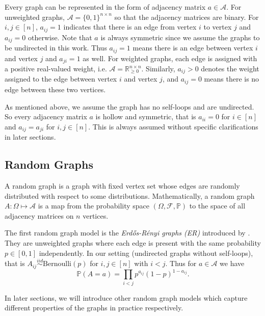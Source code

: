 Every graph can be represented in the form of adjacency matrix $a \in \mathcal{A}$. For unweighted graphs, $\mathcal{A} = \{ 0, 1 \}^{n \times n}$ so that the adjacency matrices are binary. For $i, j \in [n]$, $a_{ij} = 1$ indicates that there is an edge from vertex $i$ to vertex $j$ and $a_{ij} = 0$ otherwise. Note that $a$ is always symmetric since we assume the graphs to be undirected in this work. Thus $a_{ij} = 1$ means there is an edge between vertex $i$ and vertex $j$ and $a_{ji} = 1$ as well. For weighted graphs, each edge is assigned with a positive real-valued weight, i.e. $\mathcal{A} = \mathbb{R}^{n \times n}_{\ge 0}$. Similarly, $a_{ij} > 0$ denotes the weight assigned to the edge between vertex $i$ and vertex $j$, and $a_{ij} = 0$ means there is no edge between these two vertices.

As mentioned above, we assume the graph has no self-loops and are undirected. So every adjacency matrix $a$ is hollow and symmetric, that is $a_{ii} = 0$ for $i \in [n]$ and $a_{ij} = a_{ji}$ for $i, j \in [n]$. This is always assumed without specific clarifications in later sections.


\subsection{Random Graphs}
\label{sec:random_graphs}
A random graph is a graph with fixed vertex set whose edges are randomly distributed with respect to some distributions. Mathematically, a random graph $A: \Omega \mapsto \mathcal{A}$ is a map from the probability space $(\Omega, \mathcal{F}, \mathbb{P})$ to the space of all adjacency matrices on $n$ vertices.

\begin{example}
\label{example:ER}
The first random graph model is the {\em{Erd\H{o}s-R{\'e}nyi graphs} (ER)} introduced by \citep{gilbert1959random}.  They are unweighted graphs where each edge is present with the same probability $p \in [0, 1]$ independently. In our setting (undirected graphs without self-loops), that is $A_{ij} \stackrel{iid}{\sim} \mathrm{Bernoulli}(p)$ for $i, j \in [n]$ with $i < j$. Thus for $a \in \mathcal{A}$ we have
\[
	\mathbb{P}(A = a) = \prod_{i < j} p^{a_{ij}} (1 - p)^{1 - a_{ij}}.
\]
\end{example}

In later sections, we will introduce other random graph models which capture different properties of the graphs in practice respectively.







